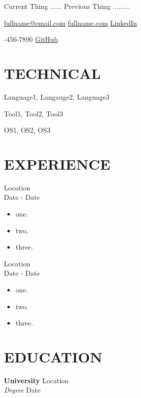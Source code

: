 \documentclass{article}
\begin{document}

\huge
{}
\normalsize
\hfill
Current Thing ...... Previous Thing .........

\noindent\hrulefill

\noindent 
\href{mailto:fullname@email.com}{fullname@email.com}
\hfill
\href{https://fullname.com}{fullname.com}
\hfill
\href{https://linkedin.com}{LinkedIn}

-456-7890
\hfill
\href{https://github.com}{GitHub}

\section*{TECHNICAL}

 \hspace{5.0em}
Language1, Langauge2, Language3

 \hspace{1.0em}
Tool1, Tool2, Tool3

 \hspace{0.5em}
OS1, OS2, OS3

\section*{EXPERIENCE}

 \hfill Location \\
 \hfill Date - Date
\begin{itemize}
\item one.
\item two.
\item three.
\end{itemize}

 \hfill Location \\
 \hfill Date - Date
\begin{itemize}
\item one.
\item two.
\item three.
\end{itemize}

\section*{EDUCATION}

{\bf University} \hfill Location \\
{\sl Degree} \hfill Date
\end{document}
